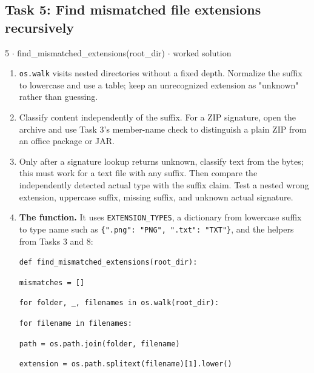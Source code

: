 \documentclass[11pt]{article}
\begin{document}
\begin{keepsection}\subsection{Task 5: Find mismatched file extensions recursively}

\begin{workedbox}{5 \ensuremath{\cdot} find\_mismatched\_extensions(root\_dir) \ensuremath{\cdot} worked solution}
\begin{enumerate}
\item \texttt{os.walk} visits nested directories without a fixed depth. Normalize the suffix to lowercase and use a table; keep an unrecognized extension as "unknown" rather than guessing.
\item Classify content independently of the suffix. For a ZIP signature, open the archive and use Task 3’s member-name check to distinguish a plain ZIP from an office package or JAR.
\item Only after a signature lookup returns unknown, classify text from the bytes; this must work for a text file with any suffix. Then compare the independently detected actual type with the suffix claim. Test a nested wrong extension, uppercase suffix, missing suffix, and unknown actual signature.
\item {}
\textbf{The function.} It uses \texttt{EXTENSION\_TYPES}, a dictionary from lowercase suffix to type name such as \texttt{\{".png": "PNG", ".txt": "TXT"\}}, and the helpers from Tasks 3 and 8:
\begin{tcolorbox}[colback=Paperblue,colframe=Paperblue,boxrule=0pt,arc=0pt,left=7pt,right=7pt,top=5pt,bottom=5pt]\small\sloppy
\noindent\hspace*{0em}\texttt{def find\_mismatched\_extensions(root\_dir):}\par
\noindent\hspace*{1em}\texttt{mismatches = []}\par
\noindent\hspace*{1em}\texttt{for folder, \_, filenames in os.walk(root\_dir):}\par
\noindent\hspace*{3em}\texttt{for filename in filenames:}\par
\noindent\hspace*{5em}\texttt{path = os.path.join(folder, filename)}\par
\noindent\hspace*{5em}\texttt{extension = os.path.splitext(filename)[1].lower()}\par

\end{tcolorbox}
\end{enumerate}
\end{workedbox}
\end{keepsection}
\end{document}
